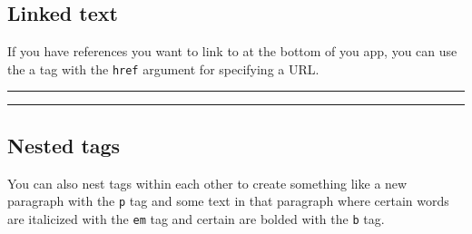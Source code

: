 \documentclass[
  letterpaper,
  DIV=11,
  numbers=noendperiod]{scrreprt}
\newenvironment{Shaded}{\begin{snugshade}}{\end{snugshade}}
\newcommand{\AttributeTok}[1]{\textcolor[rgb]{0.40,0.46,0.14}{#1}}
\newcommand{\CommentTok}[1]{\textcolor[rgb]{0.37,0.37,0.37}{#1}}
\newcommand{\ControlFlowTok}[1]{\textcolor[rgb]{0.00,0.46,0.62}{#1}}
\newcommand{\FunctionTok}[1]{\textcolor[rgb]{0.28,0.35,0.67}{#1}}
\newcommand{\NormalTok}[1]{\textcolor[rgb]{0.00,0.46,0.62}{#1}}
\newcommand{\OtherTok}[1]{\textcolor[rgb]{0.00,0.46,0.62}{#1}}
\newcommand{\SpecialCharTok}[1]{\textcolor[rgb]{0.37,0.37,0.37}{#1}}
\newcommand{\StringTok}[1]{\textcolor[rgb]{0.13,0.47,0.30}{#1}}
\begin{document}
\hypertarget{linked-text}{%
\subsection{Linked text}\label{linked-text}}

If you have references you want to link to at the bottom of you app, you
can use the a tag with the \texttt{href} argument for specifying a URL.

\begin{Shaded}
\end{Shaded}

\begin{center}\rule{0.5\linewidth}{0.5pt}\end{center}

\begin{center}\rule{0.5\linewidth}{0.5pt}\end{center}

\hypertarget{nested-tags}{%
\subsection{Nested tags}\label{nested-tags}}

You can also nest tags within each other to create something like a new
paragraph with the \texttt{p} tag and some text in that paragraph where
certain words are italicized with the \texttt{em} tag and certain are
bolded with the \texttt{b} tag.
\end{document}
